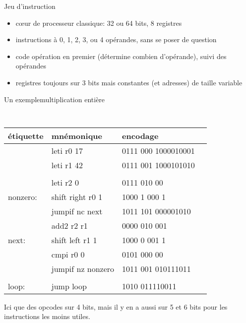 \documentclass[slidetop,11pt,table]{beamer}
\begin{document}
\begin{frame}{Jeu d'instruction}
  \begin{itemize}
  \item c\oe ur de processeur classique: 32 ou 64 bits, 8 registres
  \item instructions à 0, 1, 2, 3, ou 4 opérandes, sans se poser de question
  \item code opération en premier (détermine combien d'opérande), suivi des opérandes
  \item registres toujours sur 3 bits mais constantes (et adresses) de taille variable
  \end{itemize}
\end{frame}



\begin{frame}{Un exemple}{multiplication entière}
  \begin{center}
    \tt\small
    \begin{tabular}{llll}
    \textrm{étiquette} & \textrm{mnémonique} & \textrm{encodage}\\
    \hline
    
				 & leti	r0 17				 & 0111 000 1000010001 \\
				 & leti	r1 42				 & 0111 001 1000101010 \\
				 &									 &										 \\
				 & leti	r2 0				 & 0111 010 00				 \\
nonzero: & shift	right r0 1 & 1000 1 000 1				 \\
				 & jumpif	nc next		 & 1011 101 000001010	 \\
				 & add2	r2 r1				 & 0000 010 001				 \\
next:		 & shift	left r1 1	 & 1000 0 001 1				 \\
				 & cmpi	r0 0				 & 0101 000 00				 \\
				 & jumpif	nz nonzero & 1011 001 010111011	 \\
				 &									 &										 \\
loop:		 & jump	loop				 & 1010 011110011			 \\
  \end{tabular}
\end{center}
Ici que des opcodes sur 4 bits, mais il y en a aussi sur 5 et 6 bits pour les instructions les moins utiles.
\end{frame}
\end{document}
